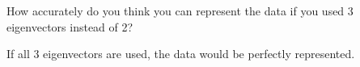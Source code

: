 How accurately do you think you can represent the data if you used 3 eigenvectors instead of 2?

\begin{solution}
    If all 3 eigenvectors are used, the data would be perfectly represented.
\end{solution}